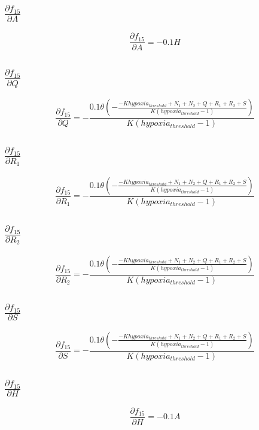 \documentclass{article}
\begin{document}
\subsection{$\frac{\partial f_{15}}{\partial A}$}
\[
\frac{\partial f_{15}}{\partial A} = - 0.1 H
\]

\subsection{$\frac{\partial f_{15}}{\partial Q}$}
\[
\frac{\partial f_{15}}{\partial Q} = - \frac{0.1 \theta\left(- \frac{- K hypoxia_{threshold} + N_{1} + N_{2} + Q + R_{1} + R_{2} + S}{K \left(hypoxia_{threshold} - 1\right)}\right)}{K \left(hypoxia_{threshold} - 1\right)}
\]

\subsection{$\frac{\partial f_{15}}{\partial R_1}$}
\[
\frac{\partial f_{15}}{\partial R_1} = - \frac{0.1 \theta\left(- \frac{- K hypoxia_{threshold} + N_{1} + N_{2} + Q + R_{1} + R_{2} + S}{K \left(hypoxia_{threshold} - 1\right)}\right)}{K \left(hypoxia_{threshold} - 1\right)}
\]

\subsection{$\frac{\partial f_{15}}{\partial R_2}$}
\[
\frac{\partial f_{15}}{\partial R_2} = - \frac{0.1 \theta\left(- \frac{- K hypoxia_{threshold} + N_{1} + N_{2} + Q + R_{1} + R_{2} + S}{K \left(hypoxia_{threshold} - 1\right)}\right)}{K \left(hypoxia_{threshold} - 1\right)}
\]

\subsection{$\frac{\partial f_{15}}{\partial S}$}
\[
\frac{\partial f_{15}}{\partial S} = - \frac{0.1 \theta\left(- \frac{- K hypoxia_{threshold} + N_{1} + N_{2} + Q + R_{1} + R_{2} + S}{K \left(hypoxia_{threshold} - 1\right)}\right)}{K \left(hypoxia_{threshold} - 1\right)}
\]

\subsection{$\frac{\partial f_{15}}{\partial H}$}
\[
\frac{\partial f_{15}}{\partial H} = - 0.1 A
\]
\end{document}
